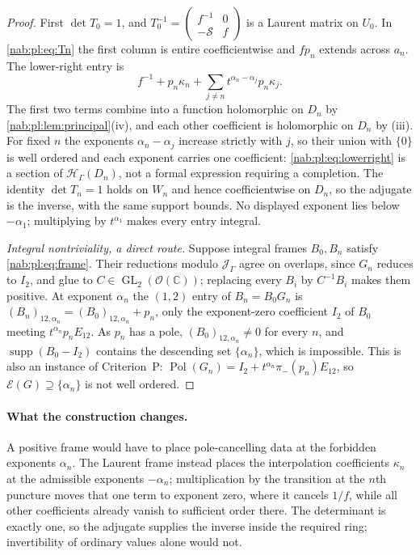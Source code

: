 \documentclass[11pt,letterpaper]{article}
\theoremstyle{definition}
\theoremstyle{remark}
\newcommand{\C}{\mathbb C}
\newcommand{\OO}{\mathcal O}
\newcommand{\HH}{\mathscr H_\Gamma}
\newcommand{\JJ}{\mathscr J_\Gamma}
\newcommand{\GL}{\operatorname{GL}}
\newcommand{\supp}{\operatorname{supp}}
\newcommand{\Pol}{\operatorname{Pol}}
\newcommand{\EU}{\mathcal E}
\numberwithin{equation}{section}
\begin{document}
\begin{proof}
First $\det T_0=1$, and $T_0^{-1}=\begin{pmatrix}f^{-1}&0\\-\mathcal S&f\end{pmatrix}$
is a Laurent matrix on $U_0$. In \eqref{nab:pl:eq:Tn} the first column is
entire coefficientwise and $fp_n$ extends across $a_n$. The lower-right entry is
\begin{equation}\label{nab:pl:eq:lowerright}
 f^{-1}+p_n\kappa_n+\sum_{j\neq n}t^{\alpha_n-\alpha_j}p_n\kappa_j .
\end{equation}
The first two terms combine into a function holomorphic on $D_n$ by
\cref{nab:pl:lem:principal}(iv), and each other coefficient is holomorphic on
$D_n$ by (iii). For fixed $n$ the exponents $\alpha_n-\alpha_j$ increase
strictly with $j$, so their union with $\{0\}$ is well ordered and each
exponent carries one coefficient: \eqref{nab:pl:eq:lowerright} is a section of
$\HH(D_n)$, not a formal expression requiring a completion. The identity
$\det T_n=1$ holds on $W_n$ and hence coefficientwise on $D_n$, so the adjugate
is the inverse, with the same support bounds. No displayed exponent lies below
$-\alpha_1$; multiplying by $t^{\alpha_1}$ makes every entry integral.

\emph{Integral nontriviality, a direct route.} Suppose integral frames
$B_0,B_n$ satisfy \eqref{nab:pl:eq:frame}. Their reductions modulo $\JJ$ agree
on overlaps, since $G_n$ reduces to $I_2$, and glue to $C\in\GL_2(\OO(\C))$;
replacing every $B_i$ by $C^{-1}B_i$ makes them positive. At exponent
$\alpha_n$ the $(1,2)$ entry of $B_n=B_0G_n$ is
$(B_n)_{12,\alpha_n}=(B_0)_{12,\alpha_n}+p_n$, only the exponent-zero
coefficient $I_2$ of $B_0$ meeting $t^{\alpha_n}p_nE_{12}$. As $p_n$ has a
pole, $(B_0)_{12,\alpha_n}\neq0$ for every $n$, and $\supp(B_0-I_2)$ contains
the descending set $\{\alpha_n\}$, which is impossible. This is also an
instance of Criterion~P: $\Pol(G_n)=I_2+t^{\alpha_n}\pi_-(p_n)E_{12}$, so
$\EU(G)\supseteq\{\alpha_n\}$ is not well ordered.
\end{proof}

\paragraph{What the construction changes.} A positive frame would have to
place pole-cancelling data at the forbidden exponents $\alpha_n$. The Laurent
frame instead places the interpolation coefficients $\kappa_n$ at the
admissible exponents $-\alpha_n$; multiplication by the transition at the $n$th
puncture moves that one term to exponent zero, where it cancels $1/f$, while all
other coefficients already vanish to sufficient order there. The determinant
is exactly one, so the adjugate supplies the inverse inside the required ring;
invertibility of ordinary values alone would not.
\end{document}
